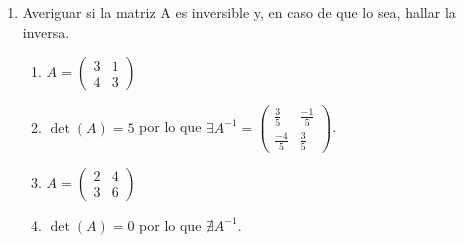 \documentclass[a4paper]{article}
\newcommand{\answer}{\item[**]}
\newcommand{\exercise}{\item}
\begin{document}
\begin{enumerate}
\begin{multicols}{3}
\begin{enumerate} [label=(\alph*)]
		\item $\begin{vmatrix} -1 & 2 & 0 & 3 \\ -13 & 4 & 0 & -8 \\ 5 & -1 & 1 & 2 \\ -9 & 5 & 0 & 0 \end{vmatrix}$
		\answer $\Delta=17$. Resolución por \href{https://youtu.be/a264lpe7I_A?t=383}{Susi Profe}

		\item $\begin{vmatrix} 2 & -1 & 0 & 3 \\ 0 & 2 & 3 & 2 \\ 1 & -1 & 3 & 0 \\ -2 & 3 & 0 & -1 \end{vmatrix}$
		\answer $\Delta=-12$. Resolución por \href{https://youtu.be/qDyeSvFMbTg}{Álgebra para Todos}

		\item $\begin{vmatrix} ~2 & ~4 & ~0 & ~2 & ~0 \\ ~3 & ~0 & ~5 & ~1 & ~0 \\ ~0 & ~6 & ~2 & ~0 & ~3 \\ ~4 & ~0 & ~2 & ~0 & ~4 \\ ~0 & ~6 & ~1 & ~0 & ~2 \end{vmatrix}$
		\answer $\Delta=-272$. Resolución por \href{https://youtu.be/fPIaDQ8TOs0}{Ktipio}

	\end{enumerate}
	\end{multicols}

	\exercise Averiguar si la matriz A es inversible y, en caso de que lo sea, hallar la inversa.
	\begin{multicols}{3}
	\begin{enumerate} [label=(\alph*)]
		
		\item $A=\begin{pmatrix} 3 & 1 \\ 4 & 3 \end{pmatrix}$
		\answer $\det(A)=5$ por lo que $\exists A^{-1}=\begin{pmatrix} \frac{3}{5} & \frac{-1}{5} \\ \frac{-4}{5} & \frac{3}{5} \end{pmatrix}$.

		\item $A=\begin{pmatrix} 2 & 4 \\ 3 & 6 \end{pmatrix}$
		\answer $\det(A)=0$ por lo que $\nexists A^{-1}$.


\end{enumerate}
\end{multicols}
\end{enumerate}
\end{document}
